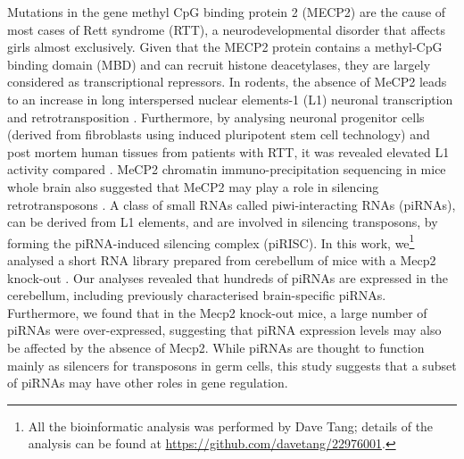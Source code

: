 Mutations in the gene methyl CpG binding protein 2 (MECP2) are the cause of most cases of Rett syndrome (RTT), a neurodevelopmental disorder that affects girls almost exclusively. Given that the MECP2 protein contains a methyl-CpG binding domain (MBD) and can recruit histone deacetylases, they are largely considered as transcriptional repressors. In rodents, the absence of MeCP2 leads to an increase in long interspersed nuclear elements-1 (L1) neuronal transcription and retrotransposition \citep{pmid21085180}. Furthermore, by analysing neuronal progenitor cells (derived from fibroblasts using induced pluripotent stem cell technology) and post mortem human tissues from patients with RTT, it was revealed elevated L1 activity compared \citep{pmid21085180}. MeCP2 chromatin immuno-precipitation sequencing in mice whole brain also suggested that MeCP2 may play a role in silencing retrotransposons \citep{pmid20188665}. A class of small RNAs called piwi-interacting RNAs (piRNAs), can be derived from L1 elements, and are involved in silencing transposons, by forming the piRNA-induced silencing complex (piRISC). In this work, we\footnote{All the bioinformatic analysis was performed by Dave Tang; details of the analysis can be found at \url{https://github.com/davetang/22976001}.} analysed a short RNA library prepared from cerebellum of mice with a Mecp2 knock-out \citep{pmid20921386}. Our analyses revealed that hundreds of piRNAs are expressed in the cerebellum, including previously characterised brain-specific piRNAs. Furthermore, we found that in the Mecp2 knock-out mice, a large number of piRNAs were over-expressed, suggesting that piRNA expression levels may also be affected by the absence of Mecp2. While piRNAs are thought to function mainly as silencers for transposons in germ cells, this study suggests that a subset of piRNAs may have other roles in gene regulation.
